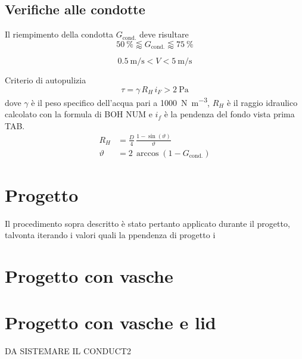 \subsection{Verifiche alle condotte}
Il riempimento della condotta $G_\text{cond.}$ deve risultare 
\begin{equation}
    \SI{50}{\percent} \lessapprox G_\text{cond.} \lessapprox\SI{75}{\percent}
\end{equation}


\begin{equation}
    \SI{0.5}{\metre\per\second} < V <  \SI{5}{\metre\per\second}
\end{equation}

Criterio di autopulizia
\begin{equation}
    \tau = \gamma \, R_H \, i_F > \SI{2}{\pascal}
\end{equation}
dove $\gamma$ è il peso specifico dell'acqua pari a \SI{1000}{\newton\per\metre\cubed}, $R_H$ è il raggio idraulico calcolato con la formula di BOH NUM e $i_f$ è la pendenza del fondo vista prima TAB.  
\begin{align}
    R_H &= \frac{D}{4} \, \frac{1 - \sin(\vartheta)}{\vartheta} \\
    \vartheta &= 2 \, \arccos(1 - G_\text{cond.})
\end{align}






\section{Progetto}
Il procedimento sopra descritto è stato pertanto applicato durante il progetto, talvonta iterando i valori quali la ppendenza di progetto i 

\section{Progetto con vasche}

\section{Progetto con vasche e lid}
DA SISTEMARE IL CONDUCT2



